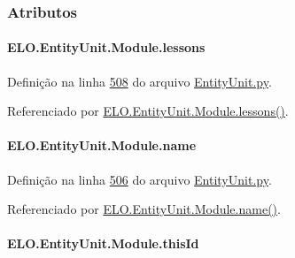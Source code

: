 \subsubsection{Atributos}
\hypertarget{classELO_1_1EntityUnit_1_1Module_a33eacfd2527f80841b87ccd73eb5fec0}{
\paragraph[{lessons}]{\setlength{\rightskip}{0pt plus 5cm}E\-L\-O.\-Entity\-Unit.\-Module.\-lessons}}\label{classELO_1_1EntityUnit_1_1Module_a33eacfd2527f80841b87ccd73eb5fec0}


Definição na linha \hyperlink{EntityUnit_8py_source_l00508}{508} do arquivo \hyperlink{EntityUnit_8py_source}{Entity\-Unit.\-py}.



Referenciado por \hyperlink{classELO_1_1EntityUnit_1_1Module_a4b12f83ecbf3722070716c9ca5adb80a}{E\-L\-O.\-Entity\-Unit.\-Module.\-lessons()}.

\hypertarget{classELO_1_1EntityUnit_1_1Module_a82adf3b2602714a4df5f0df535902854}{
\paragraph[{name}]{\setlength{\rightskip}{0pt plus 5cm}E\-L\-O.\-Entity\-Unit.\-Module.\-name}}\label{classELO_1_1EntityUnit_1_1Module_a82adf3b2602714a4df5f0df535902854}


Definição na linha \hyperlink{EntityUnit_8py_source_l00506}{506} do arquivo \hyperlink{EntityUnit_8py_source}{Entity\-Unit.\-py}.



Referenciado por \hyperlink{classELO_1_1EntityUnit_1_1Module_aacb77acc28005833928a7c6f971f44b5}{E\-L\-O.\-Entity\-Unit.\-Module.\-name()}.

\hypertarget{classELO_1_1EntityUnit_1_1Module_a02fe16e41dd435364cb9073a8a805e96}{
\paragraph[{this\-Id}]{\setlength{\rightskip}{0pt plus 5cm}E\-L\-O.\-Entity\-Unit.\-Module.\-this\-Id}}\label{classELO_1_1EntityUnit_1_1Module_a02fe16e41dd435364cb9073a8a805e96}


